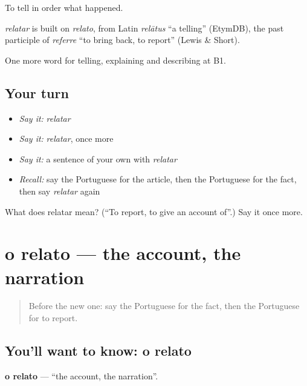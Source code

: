 To tell in order what happened.

\begin{cousinweb}
\emph{relatar} is built on \emph{relato}, from Latin \emph{relātus} \textquotedblleft{}a telling\textquotedblright{} (EtymDB), the past participle of \emph{referre} \textquotedblleft{}to bring back, to report\textquotedblright{} (Lewis \& Short).
\end{cousinweb}

\begin{grammarlens}[title={What you've built}]
One more word for telling, explaining and describing at B1.
\end{grammarlens}

\subsection*{Your turn}
\begin{itemize}
\raggedright
  \item \emph{Say it:} \emph{relatar}
  \item \emph{Say it:} \emph{relatar}, once more
  \item \emph{Say it:} a sentence of your own with \emph{relatar}
  \item \emph{Recall:} say the Portuguese for the article, then the Portuguese for the fact, then say \emph{relatar} again
\end{itemize}

\begin{tcolorbox}[breakable,colback=teal!4,colframe=teal!35!black,title={Before you move on}]
What does relatar mean? (\textquotedblleft{}To report, to give an account of\textquotedblright{}.) Say it once more.
\end{tcolorbox}
\section[o relato]{o relato — the account, the narration}

\label{lesson:PT-C281-relato}



\begin{quote}
Before the new one: say the Portuguese for the fact, then the Portuguese for to report.
\end{quote}

\subsection*{You'll want to know: o relato}
\textbf{o relato} — \textquotedblleft{}the account, the narration\textquotedblright{}.

